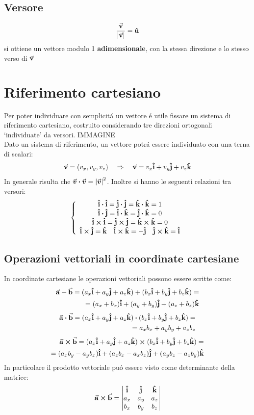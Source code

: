 \documentclass[14pt]{report}
\begin{document}
\subsection{Versore}
\[\frac{\va{v}}{\abs{\va{v}}}=\vu{u}\] si ottiene un vettore modulo 1 \textbf{adimensionale}, con la stessa direzione e lo stesso verso di $\va{v}$

\section{Riferimento cartesiano}

Per poter individuare con semplicitá un vettore é utile fissare un sistema di riferimento cartesiano, costruito considerando tre direzioni ortogonali `individuate' da versori. IMMAGINE\\
Dato un sistema di riferimento, un vettore potrá essere individuato con una terna di scalari:
\[\va{v}=(v_x, v_y, v_z)\quad\Rightarrow\quad\va{v}=v_x\vu{i}+v_y\vu{j}+v_z\vu{k}\]
In generale risulta che $\va*{v}\vdot\va*{v}=\abs{\va*{v}}^2$. Inoltre si hanno le seguenti relazioni tra versori:
\[
\left\{
\begin{array}{c}
\vu{i}\vdot\vu{i}=\vu{j}\vdot\vu{j}=\vu{k}\vdot\vu{k}=1\\
\vu{i}\vdot\vu{j}=\vu{i}\vdot\vu{k}=\vu{j}\vdot\vu{k}=0\\
\vu{i}\cp\vu{i}=\vu{j}\cp\vu{j}=\vu{k}\cp\vu{k}=0\\
\vu{i}\cp\vu{j}=\vu{k}\quad\vu{i}\cp\vu{k}=-\vu{j}\quad\vu{j}\cp\vu{k}=\vu{i}\\
\end{array}
\right.
\]

\subsection{Operazioni vettoriali in coordinate cartesiane}

In coordinate cartesiane le operazioni vettoriali possono essere scritte come:
\[\begin{split}
\va{a}+\va{b}=(a_x\vu{i}+a_y\vu{j}+a_z\vu{k})+(b_x\vu{i}+b_y\vu{j}+b_z\vu{k})=\\
=(a_x+b_x)\vu{i}+(a_y+b_y)\vu{j}+(a_z+b_z)\vu{k}
\end{split}\]
\[\begin{split}
\va{a}\vdot\va{b}=(a_x\vu{i}+a_y\vu{j}+a_z\vu{k})\vdot(b_x\vu{i}+b_y\vu{j}+b_z\vu{k})=\\
=a_xb_x+a_yb_y+a_zb_z
\end{split}\]
\[\begin{split}
\va{a}\cp\va{b}=(a_x\vu{i}+a_y\vu{j}+a_z\vu{k})\cp(b_x\vu{i}+b_y\vu{j}+b_z\vu{k})=\\
=(a_xb_y-a_yb_x)\vu{i}+(a_zb_x-a_xb_z)\vu{j}+(a_yb_z-a_zb_y)\vu{k}
\end{split}\]
In particolare il prodotto vettoriale puó essere visto come determinante della matrice:
\[
\va{a}\cp\va{b}=
\begin{vmatrix}
\vu{i} & \vu{j} & \vu{k}\\
a_x & a_y & a_z\\
b_x & b_y & b_z\\
\end{vmatrix}
\]
\end{document}
